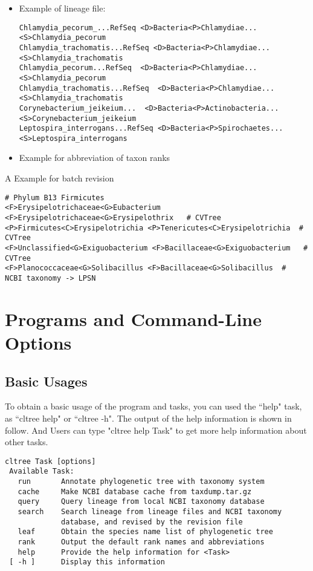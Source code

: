 \documentclass[12pt,a4paper]{article}
\begin{document}
\begin{itemize}
	\item Example of lineage file:
{\footnotesize
\begin{verbatim}
Chlamydia_pecorum_...RefSeq <D>Bacteria<P>Chlamydiae...<S>Chlamydia_pecorum
Chlamydia_trachomatis...RefSeq <D>Bacteria<P>Chlamydiae...<S>Chlamydia_trachomatis
Chlamydia_pecorum...RefSeq  <D>Bacteria<P>Chlamydiae...<S>Chlamydia_pecorum
Chlamydia_trachomatis...RefSeq  <D>Bacteria<P>Chlamydiae...<S>Chlamydia_trachomatis
Corynebacterium_jeikeium...  <D>Bacteria<P>Actinobacteria...<S>Corynebacterium_jeikeium
Leptospira_interrogans...RefSeq <D>Bacteria<P>Spirochaetes...<S>Leptospira_interrogans
\end{verbatim}
}
\item Example for abbreviation of taxon ranks
\end{itemize}
A Example for batch revision
{\footnotesize
\begin{verbatim}
# Phylum B13 Firmicutes
<F>Erysipelotrichaceae<G>Eubacterium <F>Erysipelotrichaceae<G>Erysipelothrix   # CVTree
<P>Firmicutes<C>Erysipelotrichia <P>Tenericutes<C>Erysipelotrichia  # CVTree
<F>Unclassified<G>Exiguobacterium <F>Bacillaceae<G>Exiguobacterium   # CVTree
<F>Planococcaceae<G>Solibacillus <F>Bacillaceae<G>Solibacillus  #   NCBI taxonomy -> LPSN
\end{verbatim}
}


\section{Programs and Command-Line Options}
\subsection{Basic Usages}
To obtain a basic usage of the program and tasks, you can used the ``help" task, as ``cltree help" or ``cltree -h". The output of the help information is shown in follow. And Users can type "cltree help Task" to get more help information about other tasks.
\begin{verbatim}
cltree Task [options]
 Available Task:
   run       Annotate phylogenetic tree with taxonomy system
   cache     Make NCBI database cache from taxdump.tar.gz
   query     Query lineage from local NCBI taxonomy database
   search    Search lineage from lineage files and NCBI taxonomy
             database, and revised by the revision file
   leaf      Obtain the species name list of phylogenetic tree
   rank      Output the default rank names and abbreviations
   help      Provide the help information for <Task>
 [ -h ]      Display this information
\end{verbatim}
\end{document}
